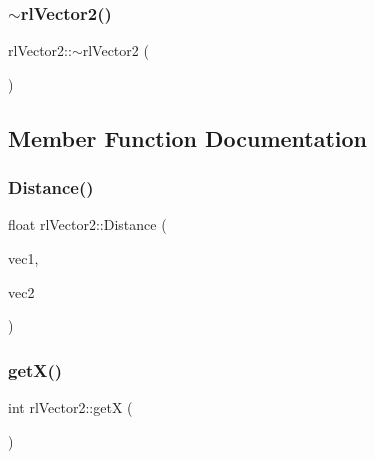 \mbox{\label{classrl_vector2_a278eda16b99c1f677a1cd6542a727ae7}} 
\subsubsection{\texorpdfstring{$\sim$rl\+Vector2()}{~rlVector2()}}
{\footnotesize\ttfamily rl\+Vector2\+::$\sim$rl\+Vector2 (\begin{DoxyParamCaption}{ }\end{DoxyParamCaption})}



\subsection{Member Function Documentation}
\mbox{\label{classrl_vector2_a39d2b451c7e62031a5accbffd09f79c1}} 
\subsubsection{\texorpdfstring{Distance()}{Distance()}}
{\footnotesize\ttfamily float rl\+Vector2\+::\+Distance (\begin{DoxyParamCaption}\item[{\hyperlink{classrl_vector2}{rl\+Vector2} \&}]{vec1,  }\item[{\hyperlink{classrl_vector2}{rl\+Vector2} \&}]{vec2 }\end{DoxyParamCaption})\hspace{0.3cm}{\ttfamily [static]}}

\mbox{\label{classrl_vector2_a1e511a0a9b2e27b5b679fe7bcd45aedc}} 
\subsubsection{\texorpdfstring{get\+X()}{getX()}}
{\footnotesize\ttfamily int rl\+Vector2\+::getX (\begin{DoxyParamCaption}{ }\end{DoxyParamCaption})}

\mbox{\label{classrl_vector2_accdeeaa5df6f7c9cd1a05c098c2576ee}} 
